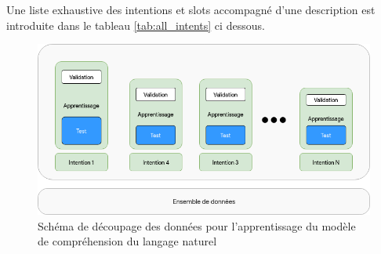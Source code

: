	Une liste exhaustive des intentions et slots accompagné d'une description est introduite dans le tableau \ref{tab:all_intents} ci dessous.
	\begin{figure}[H]
		\centering
		\includegraphics[width=.75\linewidth]{images/implementation/split.png} 
		\caption{Schéma de découpage des données pour l'apprentissage du modèle de compréhension du langage naturel} 
		\label{split}
	\end{figure}


